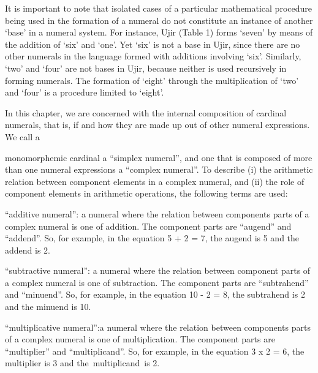 It is important to note that isolated cases of a particular mathematical procedure being used in the formation of a numeral do not constitute an instance of another {\textquoteleft}base{\textquoteright} in a numeral system. For instance, Ujir (Table 1) forms {\textquoteleft}seven{\textquoteright} by means of the addition of {\textquoteleft}six{\textquoteright} and {\textquoteleft}one{\textquoteright}. Yet {\textquoteleft}six{\textquoteright} is not a base in Ujir, since there are no other numerals in the language formed with additions involving {\textquoteleft}six{\textquoteright}. Similarly, {\textquoteleft}two{\textquoteright} and {\textquoteleft}four{\textquoteright} are not bases in Ujir, because neither is used recursively in forming numerals. The formation of {\textquoteleft}eight{\textquoteright} through the multiplication of {\textquoteleft}two{\textquoteright} and {\textquoteleft}four{\textquoteright} is a procedure limited to {\textquoteleft}eight{\textquoteright}.

In this chapter, we are concerned with the internal composition of cardinal numerals, that is, if and how they are made up out of other numeral expressions. We call a 

monomorphemic cardinal a {\textquotedblleft}simplex numeral{\textquotedblright}, and one that is composed of more than one numeral expressions a {\textquotedblleft}complex numeral{\textquotedblright}. To describe (i) the arithmetic relation between component elements in a complex numeral, and (ii) the role of component elements in arithmetic operations, the following terms are used:

{\textquotedblleft}additive numeral{\textquotedblright}: a numeral where the relation between components parts of a complex numeral is one of addition. The component parts are {\textquotedblleft}augend{\textquotedblright} and {\textquotedblleft}addend{\textquotedblright}.  So, for example, in the equation 5 + 2 = 7, the augend is 5 and the addend is 2.

{\textquotedblleft}subtractive numeral{\textquotedblright}: a numeral where the relation between component parts of a complex numeral is one of subtraction. The component parts are {\textquotedblleft}subtrahend{\textquotedblright} and {\textquotedblleft}minuend{\textquotedblright}. So, for example, in the equation 10 - 2 = 8, the subtrahend is 2 and the minuend is 10.

{\textquotedblleft}multiplicative numeral{\textquotedblright}:a numeral where the relation between components parts of a complex numeral is one of multiplication. The component parts are {\textquotedblleft}multiplier{\textquotedblright} and {\textquotedblleft}multiplicand{\textquotedblright}.  So, for example, in the equation 3 x 2 = 6, the multiplier is 3 and the~multiplicand~is 2. 

